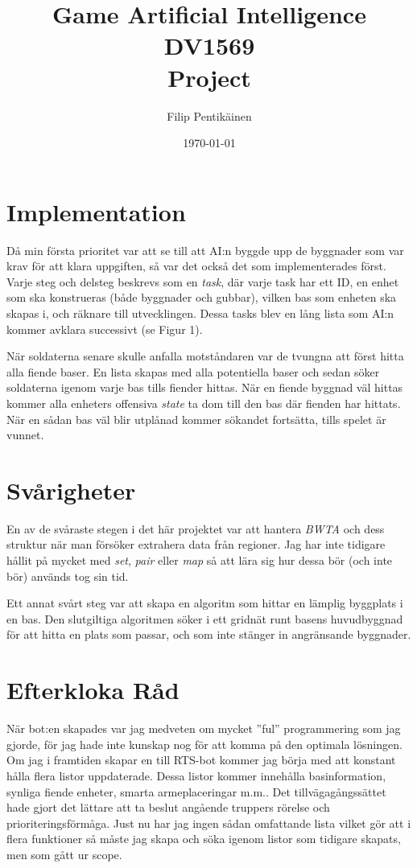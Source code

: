 \documentclass[a4paper,11pt]{article}
\begin{document}
\title{Game Artificial Intelligence \\ DV1569 \\ Project}
\author{Filip Pentikäinen}
\date{\today}
\maketitle

\section{Implementation}
Då min första prioritet var att se till att AI:n byggde upp de byggnader som var krav för att klara uppgiften, så var det också det som implementerades först. Varje steg och delsteg beskrevs som en \textit{task}, där varje task har ett ID, en enhet som ska konstrueras (både byggnader och gubbar), vilken bas som enheten ska skapas i, och räknare till utvecklingen. Dessa tasks blev en lång lista som AI:n kommer avklara successivt (se Figur 1).

När soldaterna senare skulle anfalla motståndaren var de tvungna att först hitta alla fiende baser. En lista skapas med alla potentiella baser och sedan söker soldaterna igenom varje bas tills fiender hittas. När en fiende byggnad väl hittas kommer alla enheters offensiva \textit{state} ta dom till den bas där fienden har hittats. När en sådan bas väl blir utplånad kommer sökandet fortsätta, tills spelet är vunnet.

\section{Svårigheter}
En av de svåraste stegen i det här projektet var att hantera \textit{BWTA} och dess struktur när man försöker extrahera data från regioner. Jag har inte tidigare hållit på mycket med \textit{set}, \textit{pair} eller \textit{map} så att lära sig hur dessa bör (och inte bör) används tog sin tid. 

Ett annat svårt steg var att skapa en algoritm som hittar en lämplig byggplats i en bas. Den slutgiltiga algoritmen söker i ett gridnät runt basens huvudbyggnad för att hitta en plats som passar, och som inte stänger in angränsande byggnader.

\section{Efterkloka Råd}
När bot:en skapades var jag medveten om mycket ''ful'' programmering som jag gjorde, för jag hade inte kunskap nog för att komma på den optimala lösningen. Om jag i framtiden skapar en till RTS-bot kommer jag börja med att konstant hålla flera listor uppdaterade. Dessa listor kommer innehålla basinformation, synliga fiende enheter, smarta armeplaceringar m.m.. Det tillvägagångssättet hade gjort det lättare att ta beslut angående truppers rörelse och prioriteringsförmåga. Just nu har jag ingen sådan omfattande lista vilket gör att i flera funktioner så måste jag skapa och söka igenom listor som tidigare skapats, men som gått ur scope.
\end{document}
